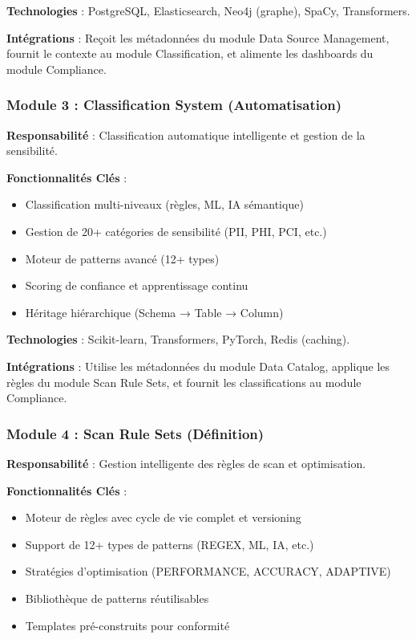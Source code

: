 \textbf{Technologies} : PostgreSQL, Elasticsearch, Neo4j (graphe), SpaCy, Transformers.

\textbf{Intégrations} : Reçoit les métadonnées du module Data Source Management, fournit le contexte au module Classification, et alimente les dashboards du module Compliance.

\subsubsection{Module 3 : Classification System (Automatisation)}

\textbf{Responsabilité} : Classification automatique intelligente et gestion de la sensibilité.

\textbf{Fonctionnalités Clés} :
\begin{itemize}
    \item Classification multi-niveaux (règles, ML, IA sémantique)
    \item Gestion de 20+ catégories de sensibilité (PII, PHI, PCI, etc.)
    \item Moteur de patterns avancé (12+ types)
    \item Scoring de confiance et apprentissage continu
    \item Héritage hiérarchique (Schema → Table → Column)
\end{itemize}

\textbf{Technologies} : Scikit-learn, Transformers, PyTorch, Redis (caching).

\textbf{Intégrations} : Utilise les métadonnées du module Data Catalog, applique les règles du module Scan Rule Sets, et fournit les classifications au module Compliance.

\subsubsection{Module 4 : Scan Rule Sets (Définition)}

\textbf{Responsabilité} : Gestion intelligente des règles de scan et optimisation.

\textbf{Fonctionnalités Clés} :
\begin{itemize}
    \item Moteur de règles avec cycle de vie complet et versioning
    \item Support de 12+ types de patterns (REGEX, ML, IA, etc.)
    \item Stratégies d'optimisation (PERFORMANCE, ACCURACY, ADAPTIVE)
    \item Bibliothèque de patterns réutilisables
    \item Templates pré-construits pour conformité
\end{itemize}

